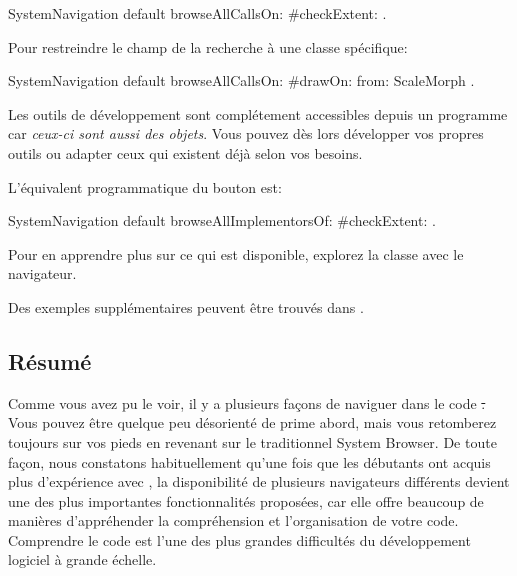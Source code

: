 \documentclass[a4paper,10pt,twoside]{book}
\begin{document}

\begin{code}{}
SystemNavigation default browseAllCallsOn: #checkExtent: .
\end{code}
Pour restreindre le champ de la recherche \`a une classe sp\'ecifique:
\begin{code}{}
SystemNavigation default browseAllCallsOn: #drawOn: from: ScaleMorph .
\end{code}
Les outils de d\'eveloppement sont compl\'etement accessibles depuis un
programme car \emph{ceux-ci sont aussi des objets}. Vous pouvez d\`es lors
d\'evelopper vos propres outils ou adapter ceux qui existent d\'ej\`a
selon vos besoins.

L'\'equivalent programmatique du bouton  est:
\begin{code}{}
SystemNavigation default browseAllImplementorsOf: #checkExtent: .
\end{code}

Pour en apprendre plus sur ce qui est disponible, explorez la classe
 avec le navigateur.

Des exemples suppl\'ementaires peuvent \^etre trouv\'es dans
 .


\subsection{R\'esum\'e}

Comme vous avez pu le voir, il y a plusieurs fa\c{c}ons de naviguer
dans le code \st.
Vous pouvez \^etre quelque peu d\'esorient\'e de prime abord, mais
vous retomberez toujours sur vos pieds en revenant sur le 
traditionnel System Browser.
De toute fa\c{c}on, nous constatons habituellement qu'une fois que les
d\'ebutants ont acquis plus d'exp\'erience avec \sq, la disponibilit\'e
de plusieurs navigateurs diff\'erents devient une des plus
importantes fonctionnalit\'es propos\'ees, car elle offre beaucoup de
mani\`eres d'appr\'ehender la compr\'ehension et l'organisation de votre
code.
Comprendre le code est l'une des plus grandes difficult\'es du d\'eveloppement
logiciel \`a grande \'echelle.
\end{document}
